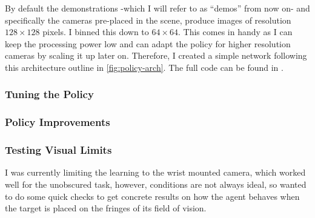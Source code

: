 

\noindent By default the demonstrations -which I will refer to as ``demos'' from now on- and specifically the cameras pre-placed in the scene, produce images of resolution $128 \times 128$ pixels. I binned this down to $64 \times 64$. This comes in handy as I can keep the processing power low and can adapt the policy for higher resolution cameras by scaling it up later on. Therefore, I created a simple network following this architecture outline in \ref{fig:policy-arch}. The full code can be found in .

\label{fig:policy-arch}

\subsubsection{Tuning the Policy}\todo{}

\subsubsection{Policy Improvements}

\subsubsection{Testing Visual Limits}
I was currently limiting the learning to the wrist mounted camera, which worked well for the unobscured task, however, conditions are not always ideal, so wanted to do some quick checks to get concrete results on how the agent behaves when the target is placed on the fringes of its field of vision. 

